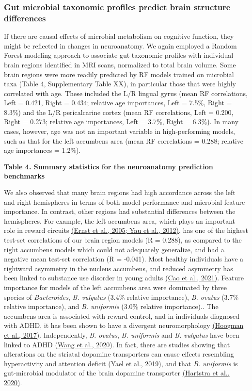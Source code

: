 \subsubsection{Gut microbial taxonomic profiles predict brain structure differences}

If there are causal effects of microbial metabolism on cognitive
function, they might be reflected in changes in neuroanatomy. We again
employed a Random Forest modeling approach to associate gut taxonomic
profiles with individual brain regions identified in MRI scans,
normalized to total brain volume. Some brain regions were more readily
predicted by RF models trained on microbial taxa (Table 4, Supplementary
Table XX), in particular those that were highly correlated with age.
These included the L/R lingual gyrus (mean RF correlations, Left =
0.421, Right = 0.434; relative age importances, Left = 7.5\%, Right =
8.3\%) and the L/R pericalcarine cortex (mean RF correlations, Left =
0.200, Right = 0.273; relative age importances, Left = 3.7\%, Right =
6.3\%). In many cases, however, age was not an important variable in
high-performing models, such as that for the left accumbens area (mean
RF correlations = 0.288; relative age importances = 1.2\%).

\textbf{Table 4. Summary statistics for the neuroanatomy prediction
benchmarks}

We also observed that many brain regions had high accordance across the
left and right hemispheres in terms of both model performance and
microbial feature importance. In contrast, other regions had substantial
differences between the hemispheres. For example, the left accumbens
area, which plays an important role in reward circuits
\href{https://www.zotero.org/google-docs/?zVicU7}{(Ernst et al., 2005;
Yau et al., 2012)}, has one of the highest test-set correlations of our
brain region models (R = 0.288), as compared to the right accumbens
models which could not adequately generalize, and had a negative mean
test-set correlation (R = -0.041). Most healthy individuals have a
rightward asymmetry in the nucleus accumbens, and reduced asymmetry has
been linked to substance use disorder in young adults
\href{https://www.zotero.org/google-docs/?V45KyN}{(Cao et al., 2021)}.
Feature importance for models of the left accumbens area were dominated
by three species of \emph{Bacteroides}, \emph{B. vulgatus} (3.4\%
relative importance), \emph{B. ovatus} (3.7\% relative importance), and
\emph{B. uniformis} (3.0\% relative importance).. The accumbens area is
associated with reward control, and in individuals diagnosed with ADHD,
it has been shown to have a divergent neuromorphology
\href{https://www.zotero.org/google-docs/?kLfEQ5}{(Hoogman et al.,
2017)}. Independently, \emph{B. ovatus}, \emph{B. uniformis} and
\emph{B. vulgatus} have been linked to ADHD
\href{https://www.zotero.org/google-docs/?luO0zh}{(Wang et al., 2020)}.
In fact, there are studies showing that alterations on the striatal
dopamine transporters can cause effects resembling hyperactivity and
attention deficit
\href{https://www.zotero.org/google-docs/?UxS47e}{(Yael et al., 2019)},
and that \emph{B. uniformis} is gut-microbial modulator of the brain
dopamine transporter
\href{https://www.zotero.org/google-docs/?L1cWJS}{(Hartstra et al.,
2020)}.

